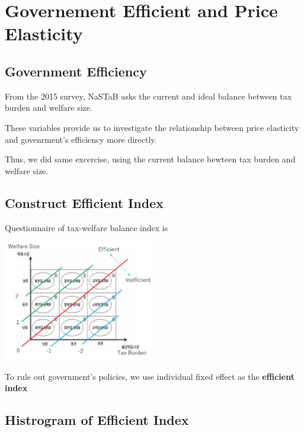 \documentclass[ review  , 3p ]{elsarticle}
\begin{document}
  \hypertarget{governement-efficient-and-price-elasticity}{%
  \section{Governement Efficient and Price Elasticity}\label{governement-efficient-and-price-elasticity}}

  \hypertarget{government-efficiency}{%
  \subsection{Government Efficiency}\label{government-efficiency}}

  From the 2015 survey,
  NaSTaB asks the current and ideal balance between tax burden and welfare size.

  These variables provide us to investigate the relationship between price elasticity and govenrment's efficiency
  more directly.

  Thus, we did same excercise, using the current balance bewteen tax burden and welfare size.

  \hypertarget{construct-efficient-index}{%
  \subsection{Construct Efficient Index}\label{construct-efficient-index}}

  Questionnaire of tax-welfare balance index is

  \includegraphics[width=0.5\textwidth,height=\textheight]{_assets/BalanceQuestion.jpg}

  To rule out government's policies, we use individual fixed effect as the \textbf{efficient index}

  \hypertarget{histrogram-of-efficient-index}{%
  \subsection{Histrogram of Efficient Index}\label{histrogram-of-efficient-index}}
\end{document}
